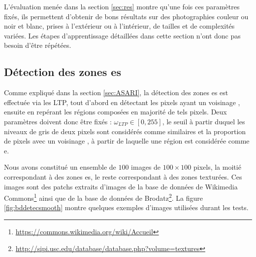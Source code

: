  L'évaluation menée dans la section \ref{sec:res} montre  qu'une fois ces paramètres fixés, ils permettent d'obtenir de bons résultats sur des photographies couleur ou noir et blanc, prises à l'extérieur ou à l'intérieur, de  tailles et de complexités variées. Les étapes d'apprentissage  détaillées dans cette section n'ont donc pas besoin d'être répétées.

\subsection{Détection des zones es}
Comme expliqué dans la section \ref{sec:ASARI}, la détection des zones es est effectuée via les LTP, tout d'abord en détectant les pixels ayant un voisinage , ensuite en repérant les régions composées en majorité de tels pixels. Deux paramètres doivent donc être fixés : $ \omega_{LTP} \in \left[0,255\right]$, le seuil à partir duquel les niveaux de gris de deux pixels sont considérés comme similaires et  la proportion de pixels avec un voisinage , à partir de laquelle une région est considérée comme e. 

Nous avons constitué un ensemble de $100$ images de $100\times100$ pixels, la moitié correspondant à des zones es, le reste correspondant à des zones texturées. Ces images sont des patchs extraits d'images de la base de données de Wikimedia Commons\footnote{\url{https://commons.wikimedia.org/wiki/Accueil}} ainsi que de la base de données de Brodatz\footnote{\url{http://sipi.usc.edu/database/database.php?volume=textures}}. La figure \ref{fig:bddetecsmooth} montre quelques exemples d'images utilisées durant les tests. 

